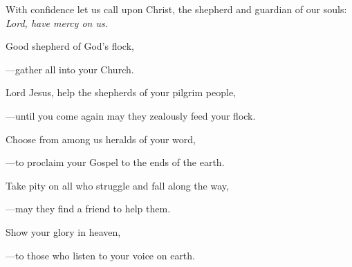 \intercessions\indent

\begin{hangpar}

With confidence let us call upon Christ, the shepherd and guardian of our souls:\\
\emph{Lord, have mercy on us.}

\medskip Good shepherd of God’s flock,

{\color{red}---\thinspace}gather all into your Church.

\medskip Lord Jesus, help the shepherds of your pilgrim people,

{\color{red}---\thinspace}until you come again may they zealously feed your flock.

\medskip Choose from among us heralds of your word,

{\color{red}---\thinspace}to proclaim your Gospel to the ends of the earth.

\medskip Take pity on all who struggle and fall along the way,

{\color{red}---\thinspace}may they find a friend to help them.

\medskip Show your glory in heaven,

{\color{red}---\thinspace}to those who listen to your voice on earth.

\end{hangpar}
